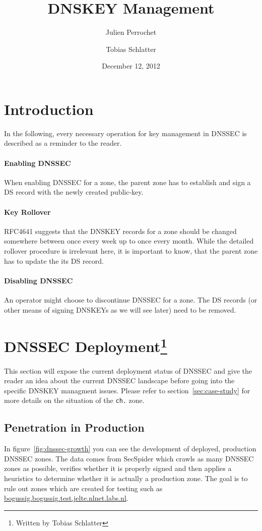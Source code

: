 \documentclass[a4paper,twocolumn]{scrartcl}
\title{DNSKEY Management}
\author{Julien Perrochet \and Tobias Schlatter}
\date{December 12, 2012}
\newcommand{\wbts}{\protect\footnote{Written by Tobias Schlatter}}
\begin{document}
\maketitle

\section{Introduction}

In the following, every necessary operation for key management in
DNSSEC is described as a reminder to the reader.

\paragraph{Enabling DNSSEC} When enabling DNSSEC for a zone, the
parent zone has to establish and sign a DS record with the newly
created public-key.

\paragraph{Key Rollover} RFC4641 \cite{RFC4641} suggests that the DNSKEY
records for a zone should be changed somewhere between once every week
up to once every month. While the detailed rollover procedure is
irrelevant here, it is important to know, that the parent zone has to
update the its DS record.

\paragraph{Disabling DNSSEC} An operator might choose to discontinue
DNSSEC for a zone. The DS records (or other means of signing DNSKEYs
as we will see later) need to be removed.

\section{DNSSEC Deployment\wbts}

This section will expose the current deployment status of DNSSEC and
give the reader an idea about the current DNSSEC landscape before
going into the specific DNSKEY managment issues. Please refer to
section~\ref{sec:case-study} for more details on the situation of the
\verb|ch.| zone.

\subsection{Penetration in Production}
In figure~\ref{fig:dnssec-growth} you can see the development of
deployed, production DNSSEC zones. The data comes from SecSpider
\cite{secspider} which crawls as many DNSSEC zones as possible,
verifies whether it is properly signed and then applies a heuristics to
determine whether it is actually a production zone. The goal is to
rule out zones which are created for testing such as
\url{bogussig.bogussig.test.jelte.nlnet.labs.nl}.
\end{document}
